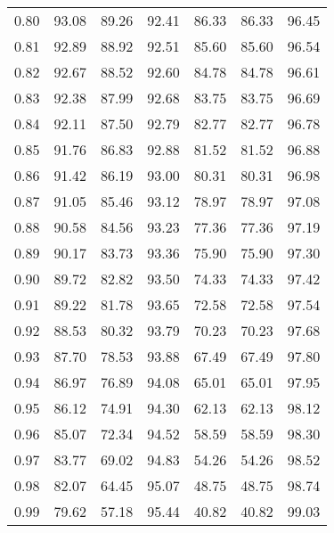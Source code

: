 \begin{tabular}{|c|c|c|c|c|c|c|}
      0.80 &     93.08 &     89.26 &      92.41 &   86.33 &      86.33 &         96.45 \\
      0.81 &     92.89 &     88.92 &      92.51 &   85.60 &      85.60 &         96.54 \\
      0.82 &     92.67 &     88.52 &      92.60 &   84.78 &      84.78 &         96.61 \\
      0.83 &     92.38 &     87.99 &      92.68 &   83.75 &      83.75 &         96.69 \\
      0.84 &     92.11 &     87.50 &      92.79 &   82.77 &      82.77 &         96.78 \\
      0.85 &     91.76 &     86.83 &      92.88 &   81.52 &      81.52 &         96.88 \\
      0.86 &     91.42 &     86.19 &      93.00 &   80.31 &      80.31 &         96.98 \\
      0.87 &     91.05 &     85.46 &      93.12 &   78.97 &      78.97 &         97.08 \\
      0.88 &     90.58 &     84.56 &      93.23 &   77.36 &      77.36 &         97.19 \\
      0.89 &     90.17 &     83.73 &      93.36 &   75.90 &      75.90 &         97.30 \\
      0.90 &     89.72 &     82.82 &      93.50 &   74.33 &      74.33 &         97.42 \\
      0.91 &     89.22 &     81.78 &      93.65 &   72.58 &      72.58 &         97.54 \\
      0.92 &     88.53 &     80.32 &      93.79 &   70.23 &      70.23 &         97.68 \\
      0.93 &     87.70 &     78.53 &      93.88 &   67.49 &      67.49 &         97.80 \\
      0.94 &     86.97 &     76.89 &      94.08 &   65.01 &      65.01 &         97.95 \\
      0.95 &     86.12 &     74.91 &      94.30 &   62.13 &      62.13 &         98.12 \\
      0.96 &     85.07 &     72.34 &      94.52 &   58.59 &      58.59 &         98.30 \\
      0.97 &     83.77 &     69.02 &      94.83 &   54.26 &      54.26 &         98.52 \\
      0.98 &     82.07 &     64.45 &      95.07 &   48.75 &      48.75 &         98.74 \\
      0.99 &     79.62 &     57.18 &      95.44 &   40.82 &      40.82 &         99.03 \\
\bottomrule
\end{tabular}
